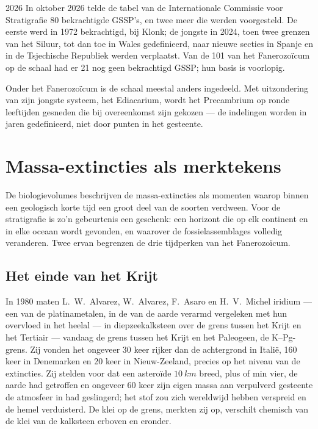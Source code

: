 \begin{dated}{2026}
In oktober 2026 telde de tabel van de Internationale Commissie voor Stratigrafie 80 bekrachtigde GSSP's, en twee meer die werden voorgesteld. De eerste werd in 1972 bekrachtigd, bij Klonk; de jongste in 2024, toen twee grenzen van het Siluur, tot dan toe in Wales gedefinieerd, naar nieuwe secties in Spanje en in de Tsjechische Republiek werden verplaatst. Van de 101  van het Fanerozoïcum op de schaal had er 21 nog geen bekrachtigd GSSP; hun basis is voorlopig.
\end{dated}

Onder het Fanerozoïcum is de schaal meestal anders ingedeeld. Met uitzondering van zijn jongste systeem, het Ediacarium, wordt het Precambrium op ronde leeftijden gesneden die bij overeenkomst zijn gekozen --- de indelingen worden in jaren gedefinieerd, niet door punten in het gesteente.

\section{Massa-extincties als merktekens}\label{sec:b1:stratigraphic-scale:extinctions}

De biologievolumes beschrijven de massa-extincties als momenten waarop binnen een geologisch korte tijd een groot deel van de soorten verdween. Voor de stratigrafie is zo'n gebeurtenis een geschenk: een horizont die op elk continent en in elke oceaan wordt gevonden, en waarover de fossielassemblages volledig veranderen. Twee ervan begrenzen de drie tijdperken van het Fanerozoïcum.

\subsection*{Het einde van het Krijt}

In 1980 maten L.~W.~Alvarez, W.~Alvarez, F.~Asaro en H.~V.~Michel iridium --- een van de platinametalen, in de  van de aarde verarmd vergeleken met hun overvloed in het heelal --- in diepzeekalksteen over de grens tussen het Krijt en het Tertiair --- vandaag de grens tussen het Krijt en het Paleogeen, de K--Pg-grens. Zij vonden het ongeveer 30 keer rijker dan de achtergrond in Italië, 160 keer in Denemarken en 20 keer in Nieuw-Zeeland, precies op het niveau van de extincties. Zij stelden voor dat een asteroïde
$\qty{10}{km}$ breed, plus of min vier, de aarde had getroffen en ongeveer 60 keer zijn eigen massa aan verpulverd gesteente de atmosfeer in had geslingerd; het stof zou zich wereldwijd hebben verspreid en de hemel verduisterd. De klei op de grens, merkten zij op, verschilt chemisch van de klei van de kalksteen erboven en eronder.

